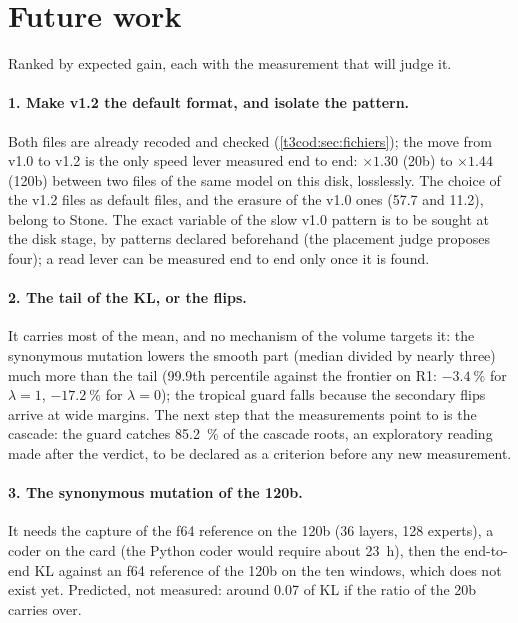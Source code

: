 \section{Future work}\label{t3dis:sec:futurs}

Ranked by expected gain, each with the measurement that will judge it.

\paragraph{1. Make v1.2 the default format, and isolate the pattern.} Both files are already recoded and checked (\cref{t3cod:sec:fichiers}); the move from v1.0 to v1.2 is the only speed lever measured end to end: $\times 1.30$ (20b) to $\times 1.44$ (120b) between two files of the same model on this disk, losslessly. The choice of the v1.2 files as default files, and the erasure of the v1.0 ones (\SI{57.7}{\Go} and \SI{11.2}{\Go}), belong to Stone. The exact variable of the slow v1.0 pattern is to be sought at the disk stage, by patterns declared beforehand (the placement judge proposes four); a read lever can be measured end to end only once it is found.

\paragraph{2. The tail of the KL, or the flips.} It carries most of the mean, and no mechanism of the volume targets it: the synonymous mutation lowers the smooth part (median divided by nearly three) much more than the tail (99.9th percentile against the frontier on R1: $-\SI{3.4}{\percent}$ for $\lambda = 1$, $-\SI{17.2}{\percent}$ for $\lambda = 0$); the tropical guard falls because the secondary flips arrive at wide margins. The next step that the measurements point to is the cascade: the guard catches \SI{85.2}{\percent} of the cascade roots, an exploratory reading made after the verdict, to be declared as a criterion before any new measurement.

\paragraph{3. The synonymous mutation of the 120b.} It needs the capture of the f64 reference on the 120b (36 layers, 128 experts), a coder on the card (the Python coder would require about \SI{23}{\hour}), then the end-to-end KL against an f64 reference of the 120b on the ten windows, which does not exist yet. Predicted, not measured: around \num{0.07} of KL if the ratio of the 20b carries over.

